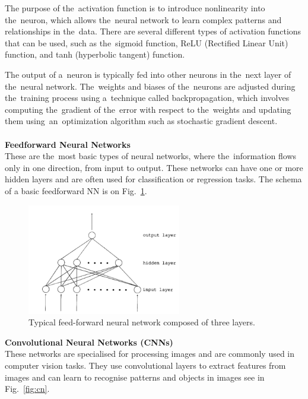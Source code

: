     The purpose of the~activation function is to introduce nonlinearity into the~neuron, which allows the~neural network to learn complex patterns and relationships in the~data. There are several different types of activation functions that can be used, such as the~sigmoid function, ReLU (Rectified Linear Unit) function, and tanh (hyperbolic tangent) function.
    
    The output of a~neuron is typically fed into other neurons in the~next layer of the~neural network. The~weights and biases of the~neurons are adjusted during the~training process using a~technique called backpropagation, which involves computing the~gradient of the~error with respect to the~weights and updating them using~an~optimization algorithm such as stochastic gradient descent.\\
    \\
    \textbf{Feedforward Neural Networks}\\
    These are the~most basic types of neural networks, where the~information flows only in one direction, from input to output. These networks can have one or more hidden layers and are often used for classification or regression tasks. The schema of a basic feedforward NN is on Fig.~\ref{fig:ff}.
    \begin{center}
        \begin{figure}[!ht]
            \centering
            \includegraphics[width=0.6\textwidth]{figures/ff}
            \caption{Typical feed-forward neural network composed of three layers. \cite{svozil1997quantum}}
            \label{fig:ff}
        \end{figure}
    \end{center}
    \textbf{Convolutional Neural Networks (CNNs)}\\
    These networks are specialised for processing images and are commonly used in computer vision tasks. They use convolutional layers to extract features from images and can learn to recognise patterns and objects in images see in Fig.~\ref{fig:cn}.
